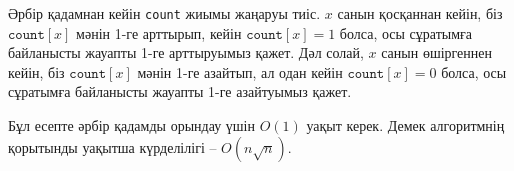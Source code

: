 Әрбір қадамнан кейін \texttt{count} жиымы жаңаруы
тиіс. $x$ санын қосқаннан кейін, біз $\texttt{count}[x]$
мәнін 1-ге арттырып, кейін $\texttt{count}[x]=1$
болса, осы сұратымға байланысты жауапты 1-ге арттыруымыз қажет.
Дәл солай, $x$ санын өшіргеннен кейін, біз $\texttt{count}[x]$
мәнін 1-ге азайтып, ал одан кейін $\texttt{count}[x]=0$ болса,
осы сұратымға байланысты жауапты 1-ге азайтуымыз қажет. 

Бұл есепте әрбір қадамды орындау үшін $O(1)$ уақыт керек.
Демек алгоритмнің қорытынды уақытша күрделілігі 
-- $O(n \sqrt n)$.